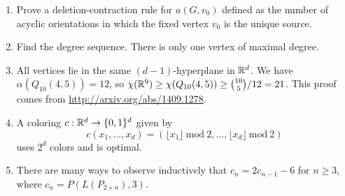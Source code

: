 \begin{enumerate}
\item Prove a deletion-contraction rule for $a(G,v_0)$ defined as the number of acyclic orientations in which the fixed vertex $v_0$ is the unique source.

\item Find the degree sequence. There is only one vertex of maximal degree.

\item All vertices lie in the same $(d-1)$-hyperplane in $\mathbb{R}^d$. We have $\alpha(Q_{10}(4,5))=12$, so $\chi(\mathbb{R}^9)\geq \chi(Q_{10}(4,5))\geq {10 \choose 5}/12 = 21$. This proof comes from \url{http://arxiv.org/abs/1409.1278}.

\item A coloring $c:\mathbb{R}^d\to\{0,1\}^d$ given by
$$c(x_1,\ldots,x_d)=(\lfloor x_1\rfloor \ \textrm{mod}\ 2,\ldots, \lfloor x_d\rfloor \ \textrm{mod}\ 2 )$$
uses $2^d$ colors and is optimal.

\item There are many ways to observe inductively that $c_n=2c_{n-1}-6$ for $n\geq 3$, where $c_n=P(L(P_{2\times n}), 3)$.


\end{enumerate}

